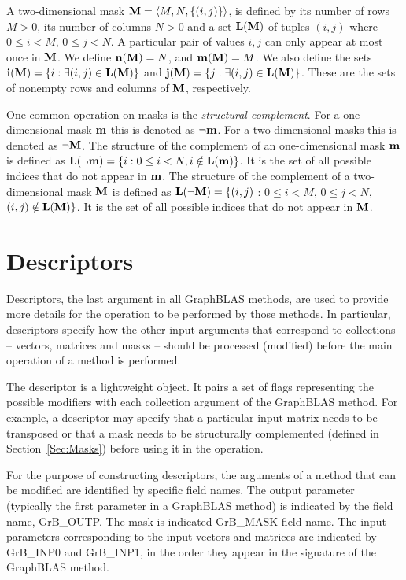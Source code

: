 A two-dimensional mask ${\bf M} = \langle M, N, \{ (i,j) \} \rangle$,
is defined by its number of rows $M>0$, its number of columns
$N>0$ and a set $\bold{L}({\bf M})$ of tuples $(i,j)$ where $0 \leq i < M$, $0 \leq
j < N$.   A particular pair of values $i,j$ can only
appear at most once in ${\bf M}$.  We define $\bold{n}({\bf M})
= N$, and $\bold{m}({\bf M}) = M$.  
We also define the sets ${\bf i({\bf M})} = \{
i : \exists (i,j) \in \bold{L}({\bf M}) \}$ and ${\bf j({\bf M})}
= \{ j : \exists (i,j) \in \bold{L}({\bf M}) \}$.  These are the sets
of nonempty rows and columns of ${\bf M}$, respectively.

One common operation on masks is the \emph{structural complement}.  For a one-dimensional mask ${\bf m}$ this
is denoted as $\neg{\bf m}$. For a two-dimensional
masks this is denoted as $\neg{\bf M}$.
The structure of the complement of an one-dimensional mask ${\bf m}$ is
defined as $\bold{L}(\neg{\bf m}) = \{i : 0 \leq i < N, i \notin \bold{L}({\bf m}) \}$.
It is the set of all possible indices that do not appear in ${\bf m}$.
The structure of the complement of a two-dimensional mask ${\bf M}$ is
defined as $\bold{L}(\neg{\bf M}) = \{(i,j)$ : $0 \leq i < M$, $0 \leq
j < N$, $(i,j) \notin \bold{L}({\bf M}) \}$.  It is the set of all possible
indices that do not appear in ${\bf M}$.

\section{Descriptors}

Descriptors, the last argument in all GraphBLAS methods, are used to
provide more details for the operation to be performed by those methods.
In particular, descriptors specify how the other input arguments that 
correspond to collections -- vectors, matrices and masks -- should
be processed (modified) before the main operation of a method is performed.

The descriptor is a lightweight object.  It pairs a set of flags
representing the possible modifiers with each collection argument of the 
GraphBLAS method.  For example, a descriptor may specify that a particular 
input matrix needs to be transposed or that a mask needs to be structurally 
complemented (defined in Section~\ref{Sec:Masks}) before using it in the operation.

For the purpose of constructing descriptors, the arguments of a method
that can be modified are identified by specific field names. The output parameter (typically
the first parameter in a GraphBLAS method) is indicated by the field name, 
{\sf GrB\_OUTP}.  The mask is indicated {\sf GrB\_MASK} field name. The input parameters
corresponding to the input vectors and matrices are indicated by {\sf GrB\_INP0} and
{\sf GrB\_INP1}, in the order they appear in the signature of the GraphBLAS method.
